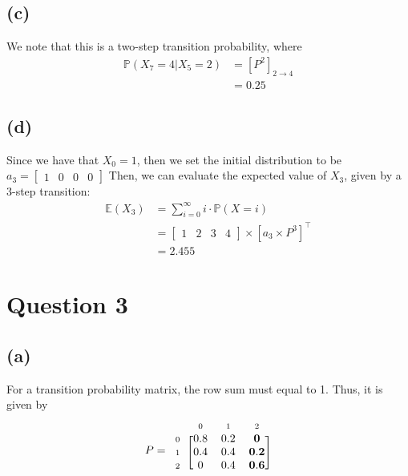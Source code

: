 \documentclass[12pt]{article}
\newcommand{\matindex}[1]{\mbox{\scriptsize#1}}%
\begin{document}
\subsection*{(c)}

We note that this is a two-step transition probability, where \begin{align*}
    \mathbb{P}(X_{7} = 4 | X_{5} = 2) &= \left[ P^{2} \right]_{2 \to  4} \\ 
    &= 0.25
\end{align*}

\subsection*{(d)}

Since we have that $X_{0} = 1$, then we set the initial distribution to be $a_3 = \begin{bmatrix}
    1&0&0&0
\end{bmatrix}$ Then, we can evaluate the expected value of $X_{3}$, given by a 3-step transition: \begin{align*}
    \mathbb{E}(X_{3}) &= \sum_{i=0}^{\infty} i \cdot \mathbb{P}(X = i) \\ 
    &= \begin{bmatrix}
        1 & 2 & 3 & 4
    \end{bmatrix} \times \left[ a_{3} \times P^{3} \right]^{\top} \\ 
    &= 2.455
\end{align*}

\section*{Question 3}

\subsection*{(a)}

For a transition probability matrix, the row sum must equal to 1. Thus, it is given by \begin{equation}
    P = \begin{blockarray}{cccc}
        & \matindex{0} & \matindex{1} & \matindex{2} \\ 
        \begin{block}{c[ccc]}
            \matindex{0} & 0.8 & 0.2 & \mathbf{0} \\ 
            \matindex{1} & 0.4 & 0.4 & \mathbf{0.2} \\ 
            \matindex{2} & 0 & 0.4 & \mathbf{0.6} \\ 
        \end{block}
    \end{blockarray}   
\end{equation}
\end{document}
